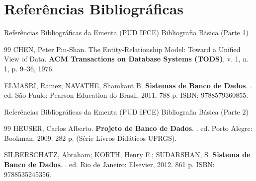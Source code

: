 \section{Referências Bibliográficas}

\begin{frame}{Referências Bibliográficas da Ementa (PUD IFCE)}
  \alert{Bibliografia Básica (Parte 1)}\par
  \vspace{0.2cm}
  \begin{thebibliography}{99}
    \footnotesize
    \setlength{\itemsep}{3mm}
      CHEN, Peter Pin-Shan.
      \newblock The Entity-Relationship Model: Toward a Unified View of Data.
      \newblock \textbf{ACM Transactions on Database Systems (TODS)}, v. 1, n. 1, p. 9--36, 1976.

      ELMASRI, Ramez; NAVATHE, Shamkant B.
      \newblock \textbf{Sistemas de Banco de Dados}.
      . ed. São Paulo: Pearson Education do Brasil, 2011. 788 p. ISBN: 9788579360855.
  \end{thebibliography}
\end{frame}

\begin{frame}{Referências Bibliográficas da Ementa (PUD IFCE)}
  \alert{Bibliografia Básica (Parte 2)}\par
  \vspace{0.2cm}
  \begin{thebibliography}{99}
    \footnotesize
    \setlength{\itemsep}{3mm}
      HEUSER, Carlos Alberto.
      \newblock \textbf{Projeto de Banco de Dados}.
      . ed. Porto Alegre: Bookman, 2009. 282 p. (Série Livros Didáticos UFRGS).

      SILBERSCHATZ, Abraham; KORTH, Henry F.; SUDARSHAN, S.
      \newblock \textbf{Sistema de Banco de Dados}.
      . ed. Rio de Janeiro: Elsevier, 2012. 861 p. ISBN: 9788535245356.
  \end{thebibliography}
\end{frame}

